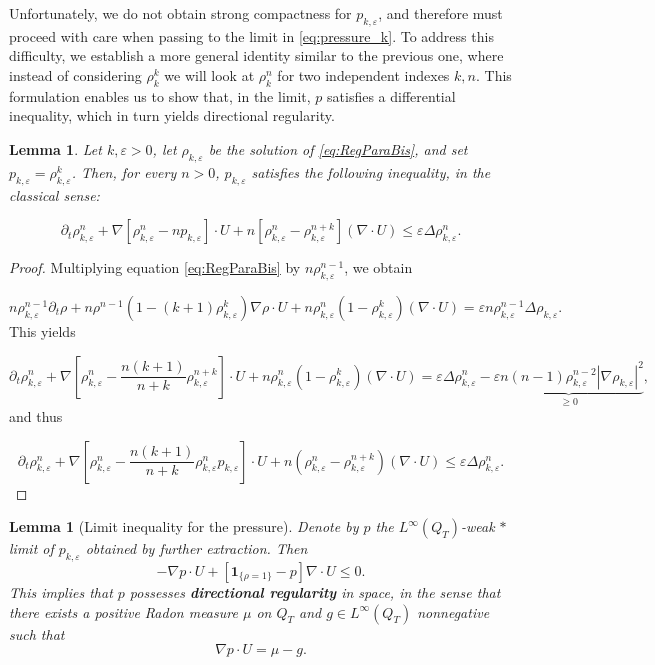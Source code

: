 \documentclass[11pt,twoside]{article}
\numberwithin{equation}{section}
\newcommand {\eps}  {\varepsilon}
\newcommand {\f}   {\frac}
\newcommand {\p}   {\partial}
\newtheorem{lemma}[theorem]{Lemma}
\begin{document}
Unfortunately, we do not obtain strong compactness for \( p_{k,\varepsilon} \), and therefore must proceed with care when passing to the limit in \eqref{eq:pressure_k}. To address this difficulty, we establish a more general identity similar to the previous one, where instead of considering $\rho_k^k$ we will look at $\rho_k^n$ for two independent indexes $k,n$. This formulation enables us to show that, in the limit, \( p \) satisfies a differential inequality, which in turn yields directional regularity.

\begin{lemma}
    Let $k,\eps >0$, let $\rho_{k,\eps}$ be the solution of \eqref{eq:RegParaBis}, and set $p_{k,\eps} = \rho_{k,\eps}^k$. Then, for every $n>0$, $p_{k,\eps}$ satisfies the following inequality, in the classical sense:

    \begin{equation}
    \label{eq:pressure_kn}
        \p_t \rho^n_{k,\eps} + \nabla[\rho^n_{k,\eps}-np_{k,\eps}]\cdot U + n[\rho^n_{k,\eps}-\rho_{k,\eps}^{n+k}](\nabla \cdot U) \le \eps \Delta\rho^n_{k,\eps}.
    \end{equation}
\end{lemma}

\begin{proof}
    Multiplying equation \eqref{eq:RegParaBis} by $n\rho_{k,\eps}^{n-1}$, we obtain

    \[
n \rho^{n-1}_{k,\eps}\p_t \rho + n\rho^{n-1}(1-(k+1)\rho^k_{k,\eps})\nabla \rho \cdot U + n\rho^n_{k,\eps}(1-\rho^k_{k,\eps})(\nabla \cdot U) = \eps n\rho^{n-1}_{k,\eps}\Delta \rho_{k,\eps} .
    \]
    This yields 
    
    \[
    \p_t \rho^n_{k,\eps} + \nabla\!\left[\rho^n_{k,\eps}-\f{n(k+1)}{n+k}\rho^{n+k}_{k,\eps} \right]\cdot U +n\rho^n_{k,\eps}(1-\rho^k_{k,\eps})(\nabla \cdot U) = \eps\Delta \rho^n_{k,\eps} - \underbrace{\eps n(n-1)\rho^{n-2}_{k,\eps}|\nabla \rho_{k,\eps}|^2}_{\ge 0},
    \]
    and thus 

    \[
    \p_t \rho_{k,\eps}^n + \nabla \!\left[\rho_{k,\eps}^n-\f{n(k+1)}{n+k}\rho_{k,\eps}^np_{k,\eps}\right]\cdot U +n(\rho^n_{k,\eps}-\rho_{k,\eps}^{n+k})(\nabla \cdot U) \le \eps\Delta\rho_{k,\eps}^n.
    \]
\end{proof}

\begin{lemma}[Limit inequality for the pressure]
\label{thm:compatibility}
Denote by $p$ the $L^\infty(Q_T)$-weak $\ast$ limit of $p_{k,\eps}$ obtained by further extraction. Then
\begin{equation}
    \label{eq:limit_pressure_ineq}
    -\nabla p \cdot U + \!\left[\mathbf{1}_{\{\rho = 1\}}-p\right]\nabla \cdot U \le 0.
\end{equation}
This implies that $p$ possesses \textbf{directional regularity} in space, in the sense that there exists a positive Radon measure $\mu$ on $Q_T$ and $g \in L^{\infty}(Q_T)$ nonnegative such that
\[
\nabla p \cdot U =\mu - g.
\]
\end{lemma}
\end{document}

